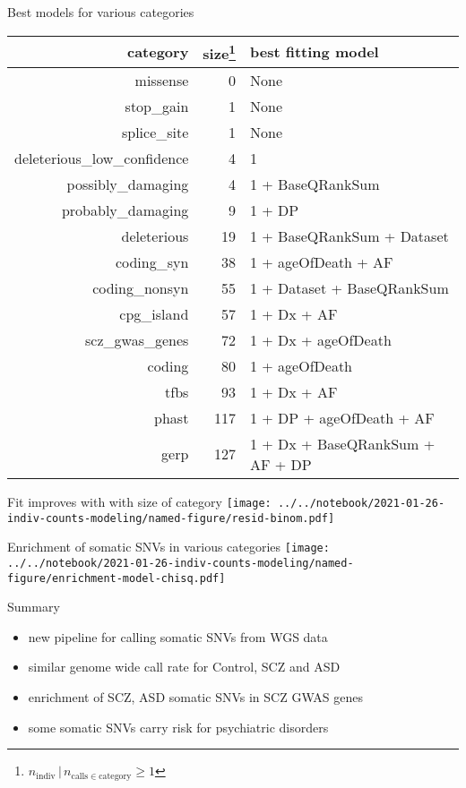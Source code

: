 \documentclass[usenames,dvipsnames]{beamer}
\begin{document}
\begin{frame}{Best models for various categories}
\begin{center}
\tiny
\begin{tabular}{rrl}
\hline
category  & size\footnote{\(n_\mathrm{indiv} \,|\, n_{\mathrm{calls} \in
			\mathrm{category}} \ge 1\)} & best fitting model  \\
\hline
missense  & 0 & None  \\
stop\_gain  & 1 & None  \\
splice\_site  & 1 & None  \\
deleterious\_low\_confidence  & 4 & 1 \\
possibly\_damaging  & 4 & 1 + BaseQRankSum  \\
probably\_damaging  & 9 & 1 + DP  \\
deleterious  & 19 & 1 + BaseQRankSum + Dataset  \\
coding\_syn  & 38 & 1 + ageOfDeath + AF  \\
coding\_nonsyn  & 55 & 1 + Dataset + BaseQRankSum  \\
cpg\_island  & 57 & 1 + Dx + AF  \\
scz\_gwas\_genes  & 72 & 1 + Dx + ageOfDeath  \\
coding  & 80 & 1 + ageOfDeath  \\
tfbs  & 93 & 1 + Dx + AF  \\
phast  & 117 & 1 + DP + ageOfDeath + AF  \\
gerp  & 127 & 1 + Dx + BaseQRankSum + AF + DP  \\
\hline
\end{tabular}
\end{center}
\end{frame}

\begin{frame}{Fit improves with with size of category}
\texttt{[image: ../../notebook/2021-01-26-indiv-counts-modeling/named-figure/resid-binom.pdf]}
\end{frame}

\begin{frame}{Enrichment of somatic SNVs in various categories}
\texttt{[image: ../../notebook/2021-01-26-indiv-counts-modeling/named-figure/enrichment-model-chisq.pdf]}
\end{frame}

\begin{frame}{Summary}
\begin{itemize}
\item new pipeline for calling somatic SNVs from WGS data
\item similar genome wide call rate for Control, SCZ and ASD
\item enrichment of SCZ, ASD somatic SNVs in SCZ GWAS genes
\item some somatic SNVs carry risk for psychiatric disorders
\end{itemize}
\end{frame}
\end{document}
